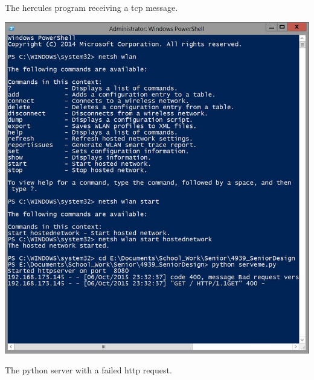 \documentclass{article}
\begin{document}
\begin{center}
The hercules program receiving a tcp message.
\end{center}

\centerline{\includegraphics[scale=.3]{Python}}

\begin{center}
The python server with a failed http request.
\end{center}
\end{document}
